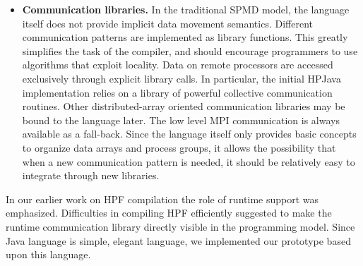 \begin{itemize}
\item \textbf{Communication libraries.} In the traditional SPMD model,
  the language itself does not provide implicit data movement
  semantics. Different communication patterns are implemented as
  library functions. This greatly simplifies the task of the compiler,
  and should encourage programmers to use algorithms that exploit
  locality. Data on remote processors are accessed exclusively through
  explicit library calls. In particular, the initial HPJava
  implementation relies on a library of powerful collective
  communication routines. Other distributed-array oriented
  communication libraries may be bound to the language later. The low
  level MPI communication is always available as a fall-back. Since
  the language itself only provides basic concepts to organize data
  arrays and process groups, it allows the possibility that when a new
  communication pattern is needed, it should be relatively easy to
  integrate through new libraries.

\end{itemize}
In our earlier work on HPF compilation \cite{Zha97} the role of runtime
support was emphasized.  Difficulties in compiling HPF efficiently
suggested to make the runtime communication library directly visible in
the programming model.  Since Java language is simple, elegant language,
we implemented our prototype based upon this language.


